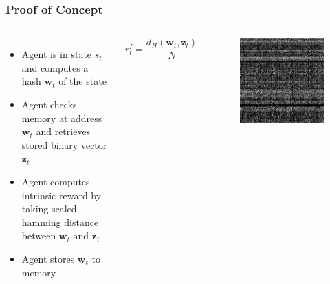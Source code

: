 \documentclass{beamer}
\begin{document}
\begin{frame}
  \frametitle{Proof of Concept}
  \begin{columns}
    \begin{itemize}
      \item Agent is in state $s_t$ and computes a hash $\mathbf{w}_t$ of the state
      \item Agent checks memory at address $\mathbf{w}_t$ and retrieves stored binary vector $\mathbf{z}_t$
      \item Agent computes intrinsic reward by taking scaled hamming distance between $\mathbf{w}_t$ and $\mathbf{z}_t$
      \item Agent stores $\mathbf{w}_t$ to memory
    \end{itemize}
    \begin{exampleblock}{}
      \begin{equation*}
        r_t^I = \frac{d_H(\mathbf{w}_t, \mathbf{z}_t)}{N}
      \end{equation*}
    \end{exampleblock}
    \begin{figure}
      \includegraphics[scale=0.25]{assets/xor-diffs.jpg}
    \end{figure}
  \end{columns}
\end{frame}
\end{document}
